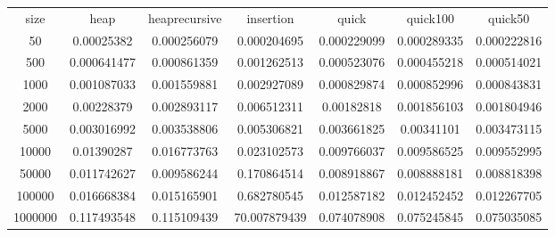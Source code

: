 \begin{table}
\begin{tabular}{ccccccc}
size & heap & heaprecursive & insertion & quick & quick100 & quick50 \\
50 & 0.00025382 & 0.000256079 & 0.000204695 & 0.000229099 & 0.000289335 & 0.000222816 \\
500 & 0.000641477 & 0.000861359 & 0.001262513 & 0.000523076 & 0.000455218 & 0.000514021 \\
1000 & 0.001087033 & 0.001559881 & 0.002927089 & 0.000829874 & 0.000852996 & 0.000843831 \\
2000 & 0.00228379 & 0.002893117 & 0.006512311 & 0.00182818 & 0.001856103 & 0.001804946 \\
5000 & 0.003016992 & 0.003538806 & 0.005306821 & 0.003661825 & 0.00341101 & 0.003473115 \\
10000 & 0.01390287 & 0.016773763 & 0.023102573 & 0.009766037 & 0.009586525 & 0.009552995 \\
50000 & 0.011742627 & 0.009586244 & 0.170864514 & 0.008918867 & 0.008888181 & 0.008818398 \\
100000 & 0.016668384 & 0.015165901 & 0.682780545 & 0.012587182 & 0.012452452 & 0.012267705 \\
1000000 & 0.117493548 & 0.115109439 & 70.007879439 & 0.074078908 & 0.075245845 & 0.075035085 \\
\end{tabular}
\end{table}
